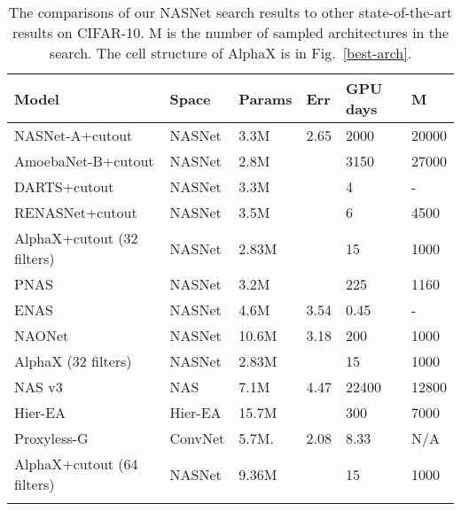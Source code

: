 \documentclass[10pt,twocolumn,letterpaper]{article}
\begin{document}
\begin{table}[t]
\setlength{\tabcolsep}{0.4em}
  \scriptsize
  \label{layers_used}
  \centering
  \begin{tabular}{l l l l l l}
    \toprule
         \textbf{Model}      & \textbf{Space}  & \textbf{Params}  & \textbf{Err} & \textbf{GPU days} & \textbf{M}\\
    \midrule
		  NASNet-A+cutout    \cite{zoph2017learning}        & NASNet    & 3.3M   & 2.65 & 2000 & 20000 \\
		  AmoebaNet-B+cutout \cite{real2018regularized}   & NASNet    & 2.8M   &  & 3150 & 27000 \\
  		  DARTS+cutout       \cite{liu2018darts}                & NASNet    & 3.3M   &   & 4  & -   \\
		  RENASNet+cutout    \cite{chen2019renas} & NASNet & 3.5M &  & 6 & 4500 \\
		  \midrule
		  AlphaX+cutout (32 filters)  		& NASNet			  & 2.83M &  & 15  & 1000   \\
		  \midrule
		  PNAS               \cite{liu2017progressive}           & NASNet	  & 3.2M   &   & 225  & 1160   \\
		  ENAS               \cite{pham2018efficient}           & NASNet    & 4.6M   & 3.54  & 0.45 &  - \\
		  NAONet             \cite{luo2018neural} & NASNet & 10.6M & 3.18 & 200 & 1000          \\
		  \midrule
          AlphaX (32 filters)  		& NASNet			  & 2.83M &          & 15  & 1000   \\
		  
	\midrule
  		  NAS v3\cite{Zoph2016}				     & NAS        	 & 7.1M   & 4.47 & 22400 & 12800  \\ 
          Hier-EA	  \cite{liu2017hierarchical} & Hier-EA       & 15.7M  &  & 300  & 7000  \\
		  Proxyless-G \cite{cai2018proxylessnas} & ConvNet       & 5.7M.  & 2.08 & 8.33 & N/A \\
	\midrule
		  AlphaX+cutout (64 filters)  		& NASNet			  & 9.36M &  & 15  & 1000   \\		  
    \bottomrule
    \label{acc-comps-cifar}
  \end{tabular}
  \caption{The comparisons of our NASNet search results to other state-of-the-art results on CIFAR-10. M is the number of sampled architectures in the search. The cell structure of AlphaX is in Fig.~\ref{best-arch}.}
  
\end{table}
\end{document}
